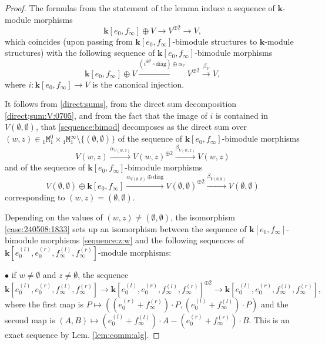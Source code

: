 \documentclass[10pt,a4paper]{amsart}
\begin{document}
\begin{proof}
The formulas from the statement of the lemma induce a sequence of $\mathbf k$-module morphisms
\begin{equation}\label{sequence:mod}
\mathbf k[e_0,f_\infty]\oplus V\to V^{\oplus 2}\to V,
\end{equation}
which coincides (upon passing from $\mathbf k[e_0,f_\infty]$-bimodule structures to $\mathbf k$-module structures) 
with the following sequence of $\mathbf k[e_0,f_\infty]$-bimodule morphisms
\begin{equation}\label{sequence:bimod}
\mathbf k[e_0,f_\infty]\oplus V\stackrel{(i^{\oplus2}\circ \mathrm{diag})\oplus\alpha_V}{\to} V^{\oplus 2}\stackrel{\beta_V}{\to} V,   
\end{equation}
where $i : \mathbf k[e_0,f_\infty]\to V$ is the canonical injection. 
 
It follows from \eqref{direct:sums}, from the direct sum decomposition \eqref{direct;sum:V:0705}, and from the fact that 
the image of $i$ is contained in $V(\emptyset,\emptyset)$,  
that  \eqref{sequence:bimod} decomposes as the direct sum over $(w,z)\in 
{}_{1}{\mathtt M}^0_{1}\times {}_{1}{\mathtt M}^\infty_{1}\setminus\{(\emptyset,\emptyset)\}$
of the sequence of $\mathbf k[e_0,f_\infty]$-bimodule morphisms  
\begin{equation}\label{sequence:z:w}
V(w,z)\stackrel{\alpha_{V(w,z)}}{\to}V(w,z)^{\oplus 2}
\stackrel{\beta_{V(w,z)}}{\to}V(w,z)    
\end{equation}
and of the sequence of $\mathbf k[e_0,f_\infty]$-bimodule morphisms
\begin{equation}\label{sequence:empty:empty}
V(\emptyset,\emptyset)\oplus\mathbf k[e_0,f_\infty]
\stackrel{\alpha_{V(\emptyset,\emptyset)}\oplus\mathrm{diag}}{\to}V(\emptyset,\emptyset)^{\oplus 2}
\stackrel{\beta_{V(\emptyset,\emptyset)}}{\to}V(\emptyset,\emptyset)    
\end{equation}
corresponding to $(w,z)=(\emptyset,\emptyset)$. 

Depending on the values of $(w,z)\neq(\emptyset,\emptyset)$, the isomorphism 
\eqref{case:240508:1833} sets up an isomorphism between the sequence of $\mathbf k[e_0,f_\infty]$-bimodule morphisms
\eqref{sequence:z:w} and the following sequences of $\mathbf k[e_0^{(l)},e_0^{(r)},f_\infty^{(l)},f_\infty^{(r)}]$-module morphisms: 

$\bullet$ if $w\neq\emptyset$ and $z\neq\emptyset$, the sequence 
$$
\mathbf k[e_0^{(l)},e_0^{(r)},f_\infty^{(l)},f_\infty^{(r)}]
\to \mathbf k[e_0^{(l)},e_0^{(r)},f_\infty^{(l)},f_\infty^{(r)}]^{\oplus 2}
\to \mathbf k[e_0^{(l)},e_0^{(r)},f_\infty^{(l)},f_\infty^{(r)}], 
$$
where the first map is $P\mapsto ((e_0^{(r)}+f_\infty^{(r)})\cdot P,(e_0^{(l)}+f_\infty^{(l)})\cdot P)$ 
and the second map is $(A,B)\mapsto (e_0^{(l)}+f_\infty^{(l)})\cdot A-(e_0^{(r)}+f_\infty^{(r)})\cdot B$. 
This is an exact sequence by Lem. \ref{lem:comm:alg}. 


\end{proof}
\end{document}
